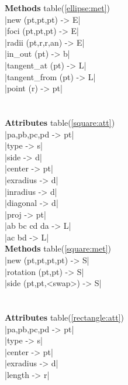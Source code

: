 \documentclass[DIV         = 14,
               fontsize    = 10,
               index       = totoc,
               twoside,
               cadre,
               headings    = small
               ]{tkz-doc}
\begin{document}
\begin{multicols}{3}
\textbf{Methods} table(\ref{ellipse:met}) \\
|new (pt,pt,pt)            -> E|   \\
|foci (pt,pt,pt)           -> E|   \\
|radii (pt,r,r,an)         -> E|   \\
|in_out (pt)               -> b|   \\
|tangent_at (pt)           -> L|   \\
|tangent_from (pt)         -> L|   \\
|point (r)                 -> pt|  \\
                                   \\
             \\                      
 \textbf{Attributes} table(\ref{square:att})      \\
|pa,pb,pc,pd               -> pt|  \\
|type                      -> s|   \\
|side                      -> d|   \\
|center                    -> pt|  \\
|exradius                  -> d|   \\
|inradius                  -> d|   \\
|diagonal                  -> d|   \\
|proj                      -> pt|  \\
|ab bc cd da               -> L|   \\
|ac bd                     -> L|   \\
 \textbf{Methods} table(\ref{square:met})      \\
|new (pt,pt,pt,pt)         -> S|   \\ 
|rotation (pt,pt)          -> S|   \\
|side (pt,pt,<swap>)       -> S|   \\
                                   \\
          \\
\textbf{Attributes} table(\ref{rectangle:att}) \\
|pa,pb,pc,pd               -> pt|  \\
|type                      -> s|   \\
|center                    -> pt|  \\
|exradius                  -> d|   \\
|length                    -> r|   \\

\end{multicols}
\end{document}
